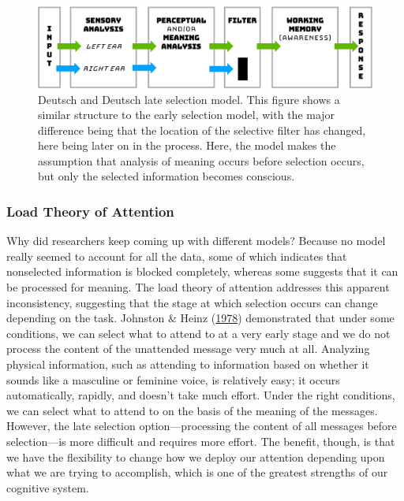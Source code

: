\documentclass[
]{krantz}
\begin{document}
\begin{figure}

{\centering \includegraphics[width=0.8\linewidth]{images/3_attention/lateselection} 

}

\caption{Deutsch and Deutsch late selection model. This figure shows a similar structure to the early selection model, with the major difference being that the location of the selective filter has changed, here being later on in the process. Here, the model makes the assumption that analysis of meaning occurs before selection occurs, but only the selected information becomes conscious.}\label{fig:lateselection}
\end{figure}

\hypertarget{load-theory-of-attention}{%
\subsubsection*{Load Theory of Attention}\label{load-theory-of-attention}}


Why did researchers keep coming up with different models? Because no model really seemed to account for all the data, some of which indicates that nonselected information is blocked completely, whereas some suggests that it can be processed for meaning. The load theory of attention addresses this apparent inconsistency, suggesting that the stage at which selection occurs can change depending on the task. Johnston \& Heinz (\protect\hyperlink{ref-Johnston1978}{1978}) demonstrated that under some conditions, we can select what to attend to at a very early stage and we do not process the content of the unattended message very much at all. Analyzing physical information, such as attending to information based on whether it sounds like a masculine or feminine voice, is relatively easy; it occurs automatically, rapidly, and doesn't take much effort. Under the right conditions, we can select what to attend to on the basis of the meaning of the messages. However, the late selection option---processing the content of all messages before selection---is more difficult and requires more effort. The benefit, though, is that we have the flexibility to change how we deploy our attention depending upon what we are trying to accomplish, which is one of the greatest strengths of our cognitive system.
\end{document}
